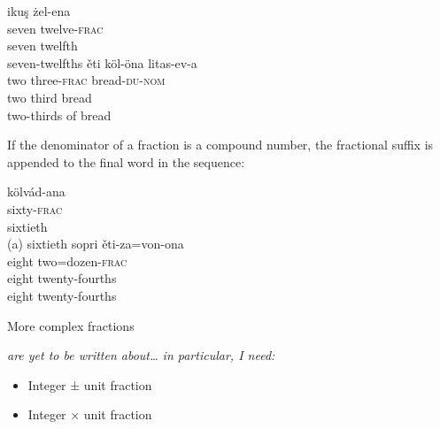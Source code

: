 \documentclass[grammar]{subfiles}
\begin{document}
  \begin{exe}
    \ex
    \begin{xlist}
      \ex {}
      \glll ikuş żel-ena\\
      seven twelve\textsc{-frac}\\
      seven twelfth\\
      \glt seven-twelfths
      \ex {}
      \glll ěti köl-öna litas-ev-a\\
      two three\textsc{-frac} bread\textsc{-du-nom}\\
      two third bread\\
      \glt two-thirds of bread
    \end{xlist}
  \end{exe}

  If the denominator of a fraction is a compound number, the fractional suffix is appended to the final word in the sequence:

  \begin{exe}
    \ex
    \begin{xlist}
      \ex {}
      \glll kölvád-ana\\
      sixty\textsc{-frac}\\
      sixtieth\\
      \glt (a) sixtieth
      \ex {}
      \glll sopri ěti-za=von-ona\\
      eight two=dozen\textsc{-frac}\\
      eight twenty-fourths\\
      \glt eight twenty-fourths
    \end{xlist}
  \end{exe}


  More complex fractions {\em are yet to be written about… in particular, I need:
    \begin{itemize}
      \item Integer ± unit fraction
      \item Integer × unit fraction
    \end{itemize}
  }
\end{document}
